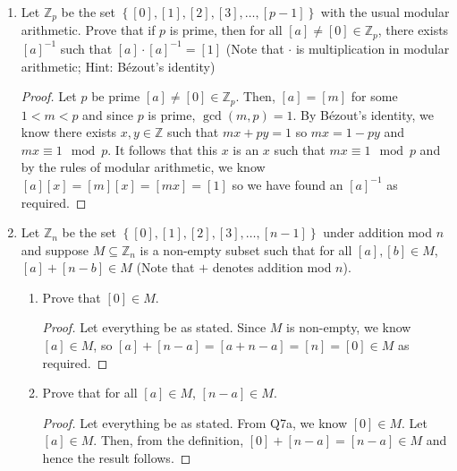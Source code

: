 \documentclass[letterpaper,12pt]{article}
\newcommand{\set}[1]{\left\{ #1 \right\}}
\begin{document}
\begin{enumerate}
\begin{proof}
\begin{itemize}
\begin{align*}
            1 + 0 + 0 &\equiv 0 \mod 2
        \end{align*}
        And this is a contradiction.
        \item If $p,q$ are both odd, \begin{align*}
             ap^2 + bpq + cq^2 &\equiv 0 \mod 2 \\
             1 + 1 + 1 &\equiv 0 \mod 2 \\
             1 &\equiv 0 \mod 2
        \end{align*}
        And this is a contradiction.
    \end{itemize}
    All cases yield contradictions and hence the result follows.
    \end{proof}
    \item Let $\mathbb{Z}_p$ be the set $\set{[0],[1],[2],[3],\ldots,[p-1]}$ with the usual modular arithmetic. Prove that if $p$ is prime, then for all $[a] \neq [0] \in \mathbb{Z}_p$, there exists $[a]^{-1}$ such that $[a] \cdot [a]^{-1} = [1]$ (Note that $\cdot$ is multiplication in modular arithmetic; Hint: Bézout's identity) \begin{proof}
        Let $p$ be prime $[a] \neq [0] \in \mathbb{Z}_p$. Then, $[a] = [m]$ for some $1 < m < p$ and since $p$ is prime, $\gcd (m,p) = 1$. By Bézout's identity, we know there exists $x,y \in \mathbb{Z}$ such that $mx + py = 1$ so $mx = 1-py$ and $mx \equiv 1 \mod p$. It follows that this $x$ is an $x$ such that $mx \equiv 1 \mod p$ and by the rules of modular arithmetic, we know $[a][x] = [m][x] = [mx] =[1]$ so we have found an $[a]^{-1}$ as required.
    \end{proof}
    \item Let $\mathbb{Z}_n$ be the set $\set{[0],[1],[2],[3],\ldots,[n-1]}$ under addition mod $n$ and suppose $M \subseteq \mathbb{Z}_n$ is a non-empty subset such that for all $[a],[b] \in M$, $[a] + [n-b] \in M$ (Note that $+$ denotes addition mod $n$). \begin{enumerate}
        \item Prove that $[0] \in M$. \begin{proof}
            Let everything be as stated. Since $M$ is non-empty, we know $[a] \in M$, so $[a] + [n-a] = [a+n-a] = [n] = [0] \in M$ as required.
        \end{proof}
        \item Prove that for all $[a] \in M$, $[n-a] \in M$.
        \begin{proof}
            Let everything be as stated. From Q7a, we know $[0] \in M$. Let $[a] \in M$. Then, from the definition, $[0] + [n-a] = [n-a] \in M$ and hence the result follows.

\end{proof}
\end{enumerate}
\end{enumerate}
\end{document}
